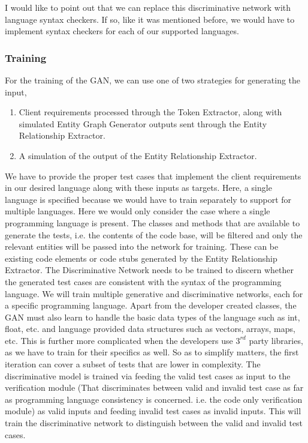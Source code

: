 \documentclass[conference, onecolumn, a4, 12pt]{IEEEtran}
\begin{document}
I would like to point out that we can replace this discriminative network with language syntax checkers. If so, like it was mentioned before, we would have to implement syntax checkers for each of our supported languages.

\subsubsection{Training}
For the training of the GAN, we can use one of two strategies for generating the input,
\begin{enumerate}
	\item Client requirements processed through the Token Extractor, along with simulated Entity Graph Generator outputs sent through the Entity Relationship Extractor.
	\item A simulation of the output of the Entity Relationship Extractor.
\end{enumerate}
We have to provide the proper test cases that implement the client requirements in our desired language along with these inputs as targets. Here, a single language is specified because we would have to train separately to support for multiple languages. Here we would only consider the case where a single programming language is present.\newline
The classes and methods that are available to generate the tests, i.e. the contents of the code base, will be filtered and only the relevant entities will be passed into the network for training. These can be existing code elements or code stubs generated by the Entity Relationship Extractor. The Discriminative Network needs to be trained to discern whether the generated test cases are consistent with the syntax of the programming language. We will train multiple generative and discriminative networks, each for a specific programming language. Apart from the developer created classes, the GAN must also learn to handle the basic data types of the language such as int, float, etc. and language provided data structures such as vectors, arrays, maps, etc. This is further more complicated when the developers use $3^{rd}$ party libraries, as we have to train for their specifics as well. So as to simplify matters, the first iteration can cover a subset of tests that are lower in complexity.\newline
The discriminative model is trained via feeding the valid test cases as input to the verification module (That discriminates between valid and invalid test case as far as programming language consistency is concerned. i.e. the code only verification module) as valid inputs and feeding invalid test cases as invalid inputs. This will train the discriminative network to distinguish between the valid and invalid test cases.\newline
\end{document}
